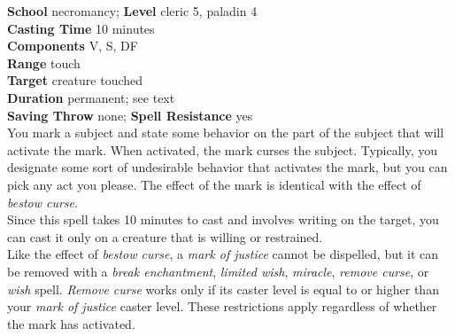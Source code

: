 \textbf{School} necromancy; \textbf{Level} cleric 5, paladin 4\\
\textbf{Casting Time} 10 minutes\\
\textbf{Components} V, S, DF\\
\textbf{Range} touch\\
\textbf{Target} creature touched\\
\textbf{Duration} permanent; see text\\
\textbf{Saving Throw} none; \textbf{Spell Resistance} yes\\
You mark a subject and state some behavior on the part of the subject that will activate the mark. When activated, the mark curses the subject. Typically, you designate some sort of undesirable behavior that activates the mark, but you can pick any act you please. The effect of the mark is identical with the effect of \textit{bestow curse}.\\
Since this spell takes 10 minutes to cast and involves writing on the target, you can cast it only on a creature that is willing or restrained.\\
Like the effect of \textit{bestow curse}, a \textit{mark of justice }cannot be dispelled, but it can be removed with a \textit{break enchantment}, \textit{limited wish}, \textit{miracle}, \textit{remove curse}, or \textit{wish }spell. \textit{Remove curse }works only if its caster level is equal to or higher than your \textit{mark of justice }caster level. These restrictions apply regardless of whether the mark has activated.\\
